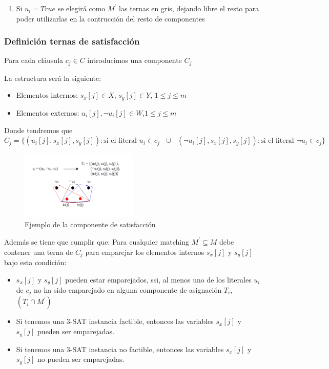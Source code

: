 \documentclass{article}
\begin{document}
\begin{enumerate}
    \item Si $u_i =True$ se elegirá como $M^{'}$ las ternas en gris, dejando libre el resto para poder utilizarlas en la contrucción del resto de componentes
    
\end{enumerate}

 
\subsubsection{Definición ternas de satisfacción}
Para cada cláusula $c_j \in C$ introducimos una componente $C_j$

La estructura será la siguiente:
\begin{itemize}
    \item Elementos internos: $s_x[j] \in X$, $s_y[j] \in Y $, $1 \leq j \leq m$
    \item Elementos externos: $u_i[j], \lnot u_i[j] \in W $,$1 \leq j \leq m$
    
\end{itemize}

Donde tendremos que $C_j=\{(u_i[j],s_x[j],s_y[j]):\text{si el literal $u_i \in c_j$  } \cup \text{ } (\lnot u_i[j],s_x[j],s_y[j]):\text{si el literal $\lnot u_i \in c_j$}\} $

\begin{figure}[H]
    \centering
    \includegraphics[width=0.5\textwidth]{photos/ejemplo_componente_satisfaccion.png}
    \caption{Ejemplo de la componente de satisfacción}
    \label{fig:etiqueta}
\end{figure}

Además se tiene que cumplir que:
Para cualquier matching $M^{'} \subseteq M$ debe contener una terna de $C_j$ para emparejar los elementos internos 
$s_x[j]$ y $s_y[j]$ bajo esta condición:
\begin{itemize}
    \item $s_x[j]$ y $s_y[j]$ pueden estar emparejados, ssi, al menos uno de los literales $u_i$ de $c_j$ no ha sido emparejado en alguna componente de asignación
$T_i$,$(T_i \cap M^{'})$
\item Si tenemos una 3-SAT instancia factible, entonces las variables $s_x[j]$ y $s_y[j]$ pueden ser emparejadas.
\item Si tenemos una 3-SAT instancia no factible, entonces las variables $s_x[j]$ y $s_y[j]$ no pueden ser emparejadas.
\end{itemize} 
\end{document}

